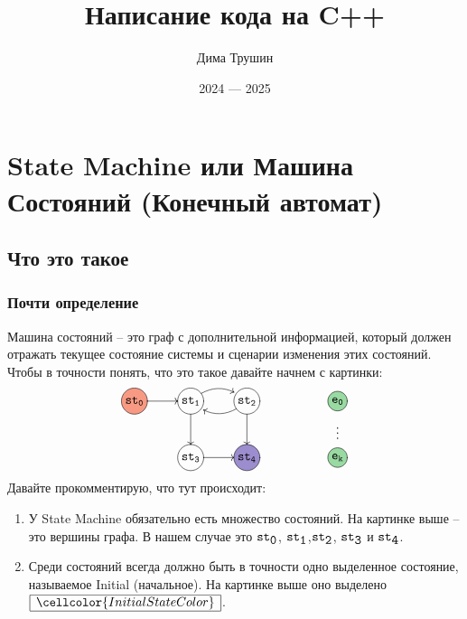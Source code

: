 \documentclass{article}
\title{Написание кода на C++}
\author{Дима Трушин}
\date{2024 --- 2025}
\begin{document}
\maketitle
\tableofcontents
\newpage
{
\section{State Machine или Машина Состояний (Конечный автомат)}

\subsection{Что это такое}

\subsubsection{Почти определение}

Машина состояний -- это граф с дополнительной информацией, который должен отражать текущее состояние системы и сценарии изменения этих состояний.
Чтобы в точности понять, что это такое давайте начнем с картинки:
\[
\xymatrix{
  *+=+[o][F-][F*:InitialStateColor]{\texttt{st}_\texttt{0}}\ar[r]&
  *+=+[o][F-]{\texttt{st}_\texttt{1}}\ar@/^10pt/[r]\ar[d]&
  *+=+[o][F-]{\texttt{st}_\texttt{2}}\ar@/^10pt/[l]\ar[d]&
  {}&
  *+=+[o][F-][F*:EventColor]{\texttt{e}_\texttt{0}}\ar@{}[d]|{\vdots}\\
  {}&
  *+=+[o][F-]{\texttt{st}_\texttt{3}}\ar[r]&
  *+=+[o][F-][F*:FinalStateColor]{\texttt{st}_\texttt{4}}&
  {}&
  *+=+[o][F-][F*:EventColor]{\texttt{e}_\texttt{k}}\\
}
\]
Давайте прокомментирую, что тут происходит:
\begin{enumerate}
\item У State Machine обязательно есть множество состояний.
На картинке выше -- это вершины графа.
В нашем случае это $\verb"st"_{\verb"0"}$, $\verb"st"_{\verb"1"}$,$\verb"st"_{\verb"2"}$, $\verb"st"_{\verb"3"}$ и $\verb"st"_{\verb"4"}$.

\item Среди состояний всегда должно быть в точности одно выделенное состояние, называемое Initial (начальное).
На картинке выше оно выделено $\begin{array}{|c|}\hline{\cellcolor{InitialStateColor}}\\\hline\end{array}$.


\end{enumerate}}
\end{document}
